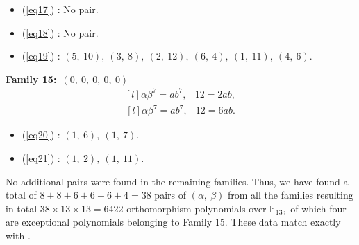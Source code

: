 \documentclass[12pt,a4wide, reqno]{amsart}
\theoremstyle{definition}
\theoremstyle{remark}
\numberwithin{equation}{section}
\begin{document}
\begin{itemize}
    \item 
    (\ref{eq17}) : No pair.
    \item 
    (\ref{eq18}) : No pair.
    \item 
    (\ref{eq19}) : $(5,~10),~(3,~8),~(2,~12),~(6,~4),~(1,~11),~(4,~6).$ 
\end{itemize}
\textbf{Family 15:}~$(0,~0,~0,~0,~0)$ 
\begin{equation}\label{eq20}
    \begin{matrix*}[l]
         \alpha \beta ^7=ab^7, & 12=2ab,
    \end{matrix*}
\end{equation}
\begin{equation}\label{eq21}
    \begin{matrix*}[l]
        \alpha \beta ^7=ab^7, &  12=6ab.
    \end{matrix*}
\end{equation}
\begin{itemize}
    \item 
    (\ref{eq20}) : $(1,~6),~(1,~7).$
    \item 
    (\ref{eq21}) : $(1,~2),~(1,~11).$
\end{itemize}
No additional pairs were found in the remaining families. Thus, we have found a total of $8+8+6+6+6+4=38$ pairs of $(\alpha,~\beta)$ from all the families resulting in total $38\times 13 \times 13=6422$ orthomorphism polynomials over $\mathbb{F}_{13},$ of which four are exceptional polynomials belonging to Family 15. These data match exactly with \cite[Table~3.2]{shallue}.
\end{document}
